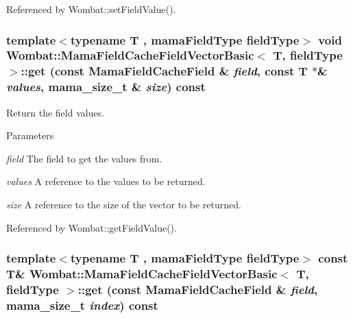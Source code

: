 Referenced by Wombat::setFieldValue().\hypertarget{classWombat_1_1MamaFieldCacheFieldVectorBasic_ac17d53c7e84ee822a8e6c506681aed7e}{
\subsubsection[{get}]{\setlength{\rightskip}{0pt plus 5cm}template$<$typename T , mamaFieldType fieldType$>$ void {\bf Wombat::MamaFieldCacheFieldVectorBasic}$<$ T, fieldType $>$::get (const {\bf MamaFieldCacheField} \& {\em field}, \/  const T $\ast$\& {\em values}, \/  {\bf mama\_\-size\_\-t} \& {\em size}) const}}
\label{classWombat_1_1MamaFieldCacheFieldVectorBasic_ac17d53c7e84ee822a8e6c506681aed7e}


Return the field values. 
\begin{DoxyParams}{Parameters}
\item[{\em field}]The field to get the values from. \item[{\em values}]A reference to the values to be returned. \item[{\em size}]A reference to the size of the vector to be returned. \end{DoxyParams}


Referenced by Wombat::getFieldValue().\hypertarget{classWombat_1_1MamaFieldCacheFieldVectorBasic_a16801dab96e3ff299737db8b2a07acea}{
\subsubsection[{get}]{\setlength{\rightskip}{0pt plus 5cm}template$<$typename T , mamaFieldType fieldType$>$ const T\& {\bf Wombat::MamaFieldCacheFieldVectorBasic}$<$ T, fieldType $>$::get (const {\bf MamaFieldCacheField} \& {\em field}, \/  {\bf mama\_\-size\_\-t} {\em index}) const}}
\label{classWombat_1_1MamaFieldCacheFieldVectorBasic_a16801dab96e3ff299737db8b2a07acea}


